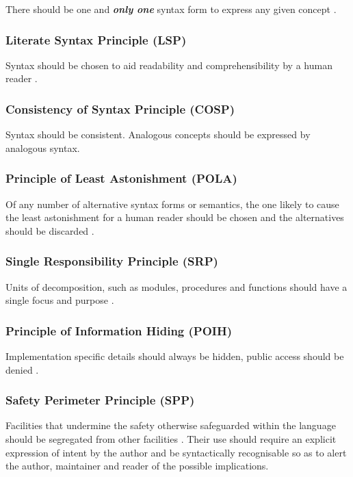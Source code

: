 \documentclass[10pt,a4paper]{article}
\renewcommand{\emph}[1]{\textbf{\textit{#1}}}
\begin{document}
There should be one and \emph{only one} syntax form to express any given
concept \cite{Dijkstra78}.

\subsubsection{Literate Syntax Principle (LSP)}
\label{LSP}

Syntax should be chosen to aid readability and comprehensibility by a human
reader \cite{Knuth84}.

\subsubsection{Consistency of Syntax Principle (COSP)}
\label{COSP}

Syntax should be consistent. Analogous concepts should be expressed by
analogous syntax.

\subsubsection{Principle of Least Astonishment (POLA)}
\label{POLA}

Of any number of alternative syntax forms or semantics, the one likely to cause
the least astonishment for a human reader should be chosen and the alternatives
should be discarded \cite{Geoffrey87}.

\subsubsection{Single Responsibility Principle (SRP)}
\label{SRP}

Units of decomposition, such as modules, procedures and functions should have
a single focus and purpose \cite{Martin09}.

\subsubsection{Principle of Information Hiding (POIH)}
\label{POIH}

Implementation specific details should always be hidden, public access should
be denied \cite{Parnas72}.

\subsubsection{Safety Perimeter Principle (SPP)}
\label{SPP}

Facilities that undermine the safety otherwise safeguarded within the language
should be segregated from other facilities \cite[ch.~29]{Wirth88}. Their
use should require an explicit expression of intent by the author and be
syntactically recognisable so as to alert the author, maintainer and reader
of the possible implications.
\end{document}
